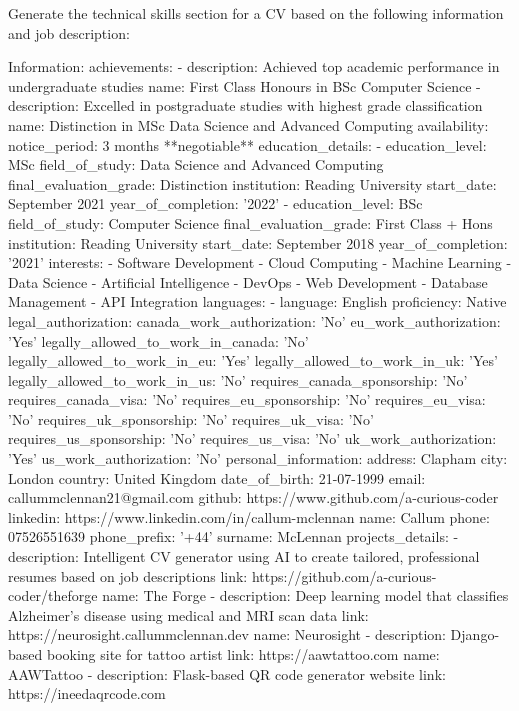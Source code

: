 
    Generate the technical skills section for a CV based on the following information and job description:

    Information:
    achievements:
- description: Achieved top academic performance in undergraduate studies
  name: First Class Honours in BSc Computer Science
- description: Excelled in postgraduate studies with highest grade classification
  name: Distinction in MSc Data Science and Advanced Computing
availability:
  notice_period: 3 months **negotiable**
education_details:
- education_level: MSc
  field_of_study: Data Science and Advanced Computing
  final_evaluation_grade: Distinction
  institution: Reading University
  start_date: September 2021
  year_of_completion: '2022'
- education_level: BSc
  field_of_study: Computer Science
  final_evaluation_grade: First Class + Hons
  institution: Reading University
  start_date: September 2018
  year_of_completion: '2021'
interests:
- Software Development
- Cloud Computing
- Machine Learning
- Data Science
- Artificial Intelligence
- DevOps
- Web Development
- Database Management
- API Integration
languages:
- language: English
  proficiency: Native
legal_authorization:
  canada_work_authorization: 'No'
  eu_work_authorization: 'Yes'
  legally_allowed_to_work_in_canada: 'No'
  legally_allowed_to_work_in_eu: 'Yes'
  legally_allowed_to_work_in_uk: 'Yes'
  legally_allowed_to_work_in_us: 'No'
  requires_canada_sponsorship: 'No'
  requires_canada_visa: 'No'
  requires_eu_sponsorship: 'No'
  requires_eu_visa: 'No'
  requires_uk_sponsorship: 'No'
  requires_uk_visa: 'No'
  requires_us_sponsorship: 'No'
  requires_us_visa: 'No'
  uk_work_authorization: 'Yes'
  us_work_authorization: 'No'
personal_information:
  address: Clapham
  city: London
  country: United Kingdom
  date_of_birth: 21-07-1999
  email: callummclennan21@gmail.com
  github: https://www.github.com/a-curious-coder
  linkedin: https://www.linkedin.com/in/callum-mclennan
  name: Callum
  phone: 07526551639
  phone_prefix: '+44'
  surname: McLennan
projects_details:
- description: Intelligent CV generator using AI to create tailored, professional
    resumes based on job descriptions
  link: https://github.com/a-curious-coder/theforge
  name: The Forge
- description: Deep learning model that classifies Alzheimer's disease using medical
    and MRI scan data
  link: https://neurosight.callummclennan.dev
  name: Neurosight
- description: Django-based booking site for tattoo artist
  link: https://aawtattoo.com
  name: AAWTattoo
- description: Flask-based QR code generator website
  link: https://ineedaqrcode.com

